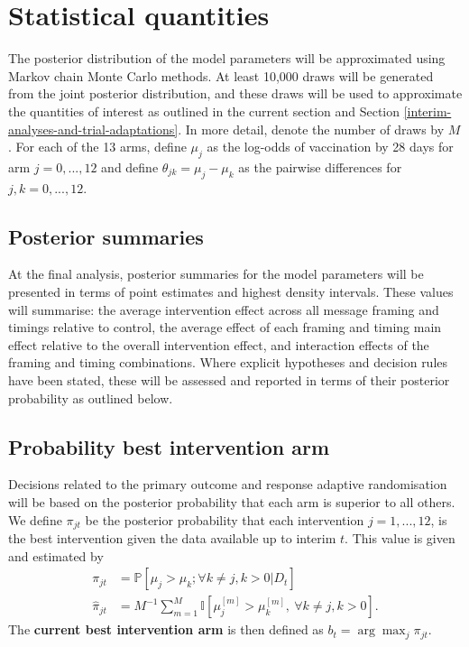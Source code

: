 \documentclass[
  bibliography=totoc]{scrreprt}
\begin{document}
\hypertarget{statistical-quantities}{%
\section{Statistical quantities}\label{statistical-quantities}}

The posterior distribution of the model parameters will be approximated using Markov chain Monte Carlo methods.
At least 10,000 draws will be generated from the joint posterior distribution, and these draws will be used to approximate the quantities of interest as outlined in the current section and Section \ref{interim-analyses-and-trial-adaptations}.
In more detail, denote the number of draws by \(M\). For each of the 13 arms, define \(\mu_j\) as the log-odds of vaccination by 28 days for arm \(j=0,...,12\) and define \(\theta_{jk} = \mu_j - \mu_k\) as the pairwise differences for \(j,k=0,...,12\).

\hypertarget{posterior-summaries}{%
\subsection{Posterior summaries}\label{posterior-summaries}}

At the final analysis, posterior summaries for the model parameters will be presented in terms of point estimates and highest density intervals.
These values will summarise: the average intervention effect across all message framing and timings relative to control, the average effect of each framing and timing main effect relative to the overall intervention effect, and interaction effects of the framing and timing combinations.
Where explicit hypotheses and decision rules have been stated, these will be assessed and reported in terms of their posterior probability as outlined below.

\hypertarget{probability-best-intervention-arm}{%
\subsection{Probability best intervention arm}\label{probability-best-intervention-arm}}

Decisions related to the primary outcome and response adaptive randomisation will be based on the posterior probability that each arm is superior to all others.
We define \(\pi_{jt}\) be the posterior probability that each intervention \(j=1,...,12\), is the best intervention given the data available up to interim \(t\).
This value is given and estimated by
\[
\begin{aligned}
\pi_{jt} &= \mathbb P[\mu_j > \mu_k;\forall k\ne j,k>0|D_t] \\
\hat\pi_{jt} &= M^{-1}\sum_{m=1}^M \mathbb I\left[\mu_{j}^{[m]}>\mu_k^{[m]},\ \forall k\ne j,k>0\right].
\end{aligned}
\]
The \textbf{current best intervention arm} is then defined as \(b_t = \arg\max_j \pi_{jt}\).
\end{document}

